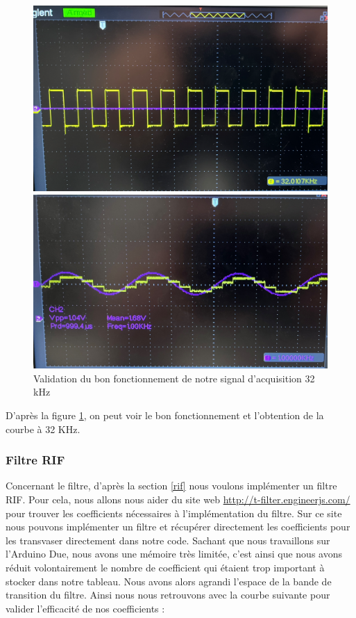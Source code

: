 \documentclass[a4paper,11pt]{article}
\begin{document}
\begin{figure}[H]
\begin{minipage}{0.48\textwidth}
\centering
\includegraphics[scale=0.23]{images/numerisation1.png}
\end{minipage}
\hfill
\begin{minipage}{0.48\textwidth}
\centering
\includegraphics[scale=0.3]{images/escalier.png}
\end{minipage}
\caption{Validation du bon fonctionnement de notre signal d'acquisition 32 kHz} \label{fig:acquisition}
\end{figure}

D'après la figure \ref{fig:acquisition}, on peut voir le bon fonctionnement et l'obtention de la courbe à 32 KHz.

\subsubsection{Filtre RIF}
Concernant le filtre, d'après la section \ref{rif} nous voulons implémenter un filtre RIF. Pour cela, nous allons nous aider du site web \url{http://t-filter.engineerjs.com/} \cite{filtre2} pour trouver les coefficients nécessaires à l'implémentation du filtre. Sur ce site nous pouvons implémenter un filtre et récupérer directement les coefficients pour les transvaser directement dans notre code. Sachant que nous travaillons sur l'Arduino Due, nous avons une mémoire très limitée, c'est ainsi que nous avons réduit volontairement le nombre de coefficient qui étaient trop important à stocker dans notre tableau. Nous avons alors agrandi l'espace de la bande de transition du filtre. Ainsi nous nous retrouvons avec la courbe suivante pour valider l'efficacité de nos coefficients :
\end{document}
